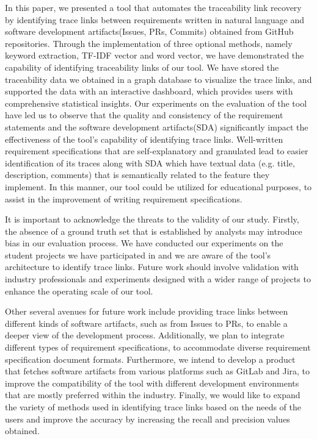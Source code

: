 \documentclass[conference]{IEEEtran}
\begin{document}
In this paper, we presented a tool that automates the traceability link recovery by identifying trace links between requirements written in natural language and software development artifacts(Issues, PRs, Commits) obtained from GitHub repositories. Through the implementation of three optional methods, namely keyword extraction, TF-IDF vector and word vector, we have demonstrated the capability of identifying traceability links of our tool. We have stored the traceability data we obtained in a graph database to visualize the trace links, and supported the data with an interactive dashboard, which provides users with comprehensive statistical insights.
Our experiments on the evaluation of the tool have led us to observe that the quality and consistency of the requirement statements and the software development artifacts(SDA) significantly impact the effectiveness of the tool's capability of identifying trace links. Well-written requirement specifications that are self-explanatory and granulated lead to easier identification of its traces along with SDA which have textual data (e.g. title, description, comments) that is semantically related to the feature they implement. In this manner, our tool could be utilized for educational purposes, to assist in the improvement of writing requirement specifications.

It is important to acknowledge the threats to the validity of our study. Firstly, the absence of a ground truth set that is established by analysts may introduce bias in our evaluation process. We have conducted our experiments on the student projects we have participated in and we are aware of the tool's architecture to identify trace links. Future work should involve validation with industry professionals and experiments designed with a wider range of projects to enhance the operating scale of our tool. 

Other several avenues for future work include providing trace links between different kinds of software artifacts, such as from Issues to PRs, to enable a deeper view of the development process. Additionally, we plan to integrate different types of requirement specifications, to accommodate diverse requirement specification document formats. Furthermore, we intend to develop a product that fetches software artifacts from various platforms such as GitLab and Jira, to improve the compatibility of the tool with different development environments that are mostly preferred within the industry. Finally, we would like to expand the variety of methods used in identifying trace links based on the needs of the users and improve the accuracy by increasing the recall and precision values obtained.
\end{document}
